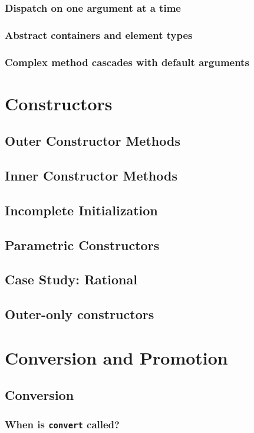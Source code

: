     \subsection{Dispatch on one argument at a time}
    \subsection{Abstract containers and element types}
    \subsection{Complex method {\textquotedbl}cascades{\textquotedbl} with default arguments}
  \chapter{Constructors}
    \section{Outer Constructor Methods}
    \section{Inner Constructor Methods}
    \section{Incomplete Initialization}
    \section{Parametric Constructors}
    \section{Case Study: Rational}
    \section{Outer-only constructors}
  \chapter{Conversion and Promotion}
    \section{Conversion}
    \subsection{When is \texttt{convert} called?}
